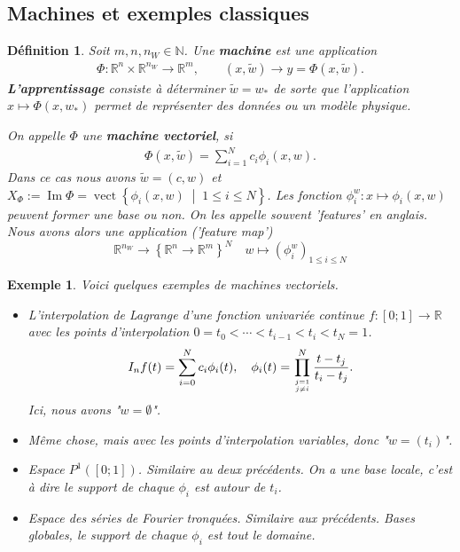\documentclass[11pt,a4paper, french]{article}
\newcommand{\nparammodel}{n_W}
\newcommand{\N}{\mathbb N}
\newcommand{\R}{\mathbb R}
\newcommand{\Set}[1]{\left\{#1\right\}}
\newcommand{\vect}[2]{\operatorname{vect}\left\{#1\;\middle|\;#2\right\}}
\newcommand{\im}{\operatorname{Im}}
\newtheorem{definition}[theorem]{Définition}
\newtheorem{example}[theorem]{Exemple}
\begin{document}
\subsection{Machines et exemples classiques}\label{subsec:}

%
\begin{definition}\label{definition:}
Soit $m,n,\nparammodel\in\N$. Une \textbf{machine} est une application 
\begin{align*}
\Phi:\R^n\times \R^{\nparammodel}\to \R^m,\qquad (x,\tilde w)\to y = \Phi(x,\tilde w).
\end{align*}
\textbf{L'apprentissage} consiste à déterminer $\tilde w=w_*$ de sorte que l'application $x\mapsto \Phi(x,w_*)$ permet de représenter des données ou un modèle physique.

On appelle $\Phi$ une \textbf{machine vectoriel}, si
\begin{align*}
\Phi(x,\tilde w) = \sum_{i=1}^N c_i \phi_i(x,w).
\end{align*}
Dans ce cas nous avons $\tilde w = (c,w)$ et $X_{\Phi}:=\im\Phi =\vect{\phi_i(x,w)}{1\le i\le N}$.
Les fonction $\phi_i^{w} : x\mapsto \phi_i(x,w)$ peuvent former une base ou non. On les appelle souvent 'features' en anglais. 
Nous avons alors une application ('feature map')
%
\begin{equation}\label{equation:}
\R^{\nparammodel}\to \Set{\R^n\to \R^m}^N\quad w\mapsto (\phi_i^{w})_{1\le i\le N}
\end{equation}
%
%
\end{definition}
%
%
\begin{example}\label{example:}
Voici quelques exemples de machines vectoriels.
\begin{itemize}
\item L'interpolation de Lagrange d'une fonction univariée continue $f:[0;1]\to\R$ avec les points d'interpolation $0 = t_0 < \cdots < t_{i-1}<t_{i} < t_N=1$.
\begin{align*}
I_n f(t) = \sum_{i=0}^N c_i \phi_i(t),\quad \phi_i(t)=\prod_{j=1\atop j\ne i}^{N} \frac{t-t_j}{t_i-t_j}.
\end{align*}
Ici, nous avons "$w=\emptyset$".
\item Même chose, mais avec les points d'interpolation variables, donc "$w=(t_i)$".
\item Espace $P^1([0;1])$. Similaire au deux précédents. On a une base locale, c'est à dire le support de chaque $\phi_i$ est autour de $t_i$.
\item Espace des séries de Fourier tronquées. Similaire aux précédents. Bases globales, le support de chaque $\phi_i$ est tout le domaine.
\end{itemize}
\end{example}
%
\end{document}
